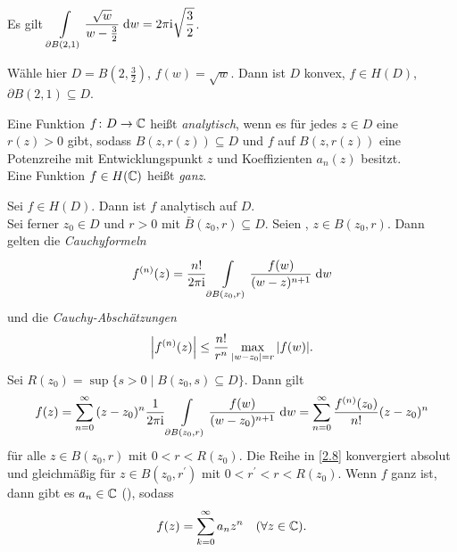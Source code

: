 \documentclass[a4paper,twoside,DIV15,BCOR12mm]{scrbook}
\begin{document}
\begin{bsp*}
  Es gilt $\displaystyle\int\limits_{\partial B(2,1)}^{}{\frac{\sqrt{w}}{w-\frac32}}\;\mathrm{d}w = 2\pi\mathrm{i}\sqrt{\frac32}$.

  Wähle hier $D=B(2,\frac32)$, $f(w)=\sqrt{w}$. Dann ist $D$ konvex, $f\in H(D)$, $\partial B(2, 1)\subseteq D$.
\end{bsp*}

\begin{dfn} \label{dfn2.24}
  Eine Funktion $f\colon D\to\mathbb{C}$ heißt \emph{analytisch}, wenn es für jedes $z\in D$ eine $r(z)>0$ gibt, sodass $B(z,
  r(z))\subseteq D$ und $f$ auf $B(z,r(z))$ eine Potenzreihe mit Entwicklungspunkt $z$ und Koeffizienten $a_n(z)$ besitzt.\\
  Eine Funktion $f\in H(\mathbb{C})$ heißt \emph{ganz}.
\end{dfn}

\begin{thm}[Entwicklungssatz] \label{thm2.25}
  Sei $f\in H(D)$. Dann ist $f$ analytisch auf $D$.\\
  Sei ferner $z_0\in D$ und $r>0$ mit $\bar{B}(z_0,r)\subseteq D$. Seien , $z\in B(z_0,r)$. Dann gelten die
  \emph{Cauchyformeln}
  \begin{equation} \label{2.6}
    f^{(n)}(z) = \frac{n!}{2\pi\mathrm{i}} \int\limits_{\partial B(z_0,r)}^{}{\frac{f(w)}{(w-z)^{n+1}}}\;\mathrm{d}w
  \end{equation}
  und die \emph{Cauchy-Abschätzungen}
  \begin{equation} \label{2.7}
    \left\lvert f^{(n)}(z)\right\lvert \leq \frac{n!}{r^n} \max_{\left\lvert w-z_0\right\lvert=r}{\left\lvert f(w)\right\lvert}.
  \end{equation}
  Sei $R(z_0) = \sup{\{s>0 \mid B(z_0,s) \subseteq D\}}$. Dann gilt
  \begin{equation} \label{2.8}
    f(z) = \sum_{n=0}^\infty{(z-z_0)^n\frac{1}{2\pi\mathrm{i}}\ensuremath{\int\limits_{\partial B(z_0,r)}^{}{\frac{f(w)}{(w-z_0)^{n+1}}}\;\mathrm{d}w}}
    = \sum_{n=0}^\infty{\frac{f^{(n)}(z_0)}{n!}(z-z_0)^n}
  \end{equation}
  für alle $z\in B(z_0,r)$ mit $0<r<R(z_0)$. Die Reihe in \eqref{2.8} konvergiert absolut und gleichmäßig für $z\in
  B(z_0,r^\prime)$ mit $0<r^\prime<r<R(z_0)$. Wenn $f$ ganz ist, dann gibt es $a_n\in\mathbb{C}$ (), sodass
  \[ f(z) = \sum_{k=0}^\infty{a_nz^n} \quad (\forall z\in\mathbb{C}). \]
\end{thm}

\end{document}
